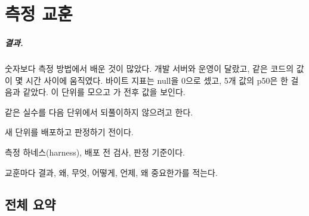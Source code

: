 \chapter{측정 교훈}\label{ch:lessons}

\paragraph{결과.}
숫자보다 측정 방법에서 배운 것이 많았다.
개발 서버와 운영이 달랐고, 같은 코드의 값이 몇 시간 사이에 움직였다.
바이트 지표는 null을 0으로 셌고, 5개 값의 p50은 한 걸음과 같았다.
이 단위를 모으고 가 전후 값을 보인다.

\begin{inbrief}
  \item[Why] 같은 실수를 다음 단위에서 되풀이하지 않으려고 한다.
  \item[When] 새 단위를 배포하고 판정하기 전이다.
  \item[Where] 측정 하네스(harness), 배포 전 검사, 판정 기준이다.
  \item[How] 교훈마다 결과, 왜, 무엇, 어떻게, 언제, 왜 중요한가를 적는다.
\end{inbrief}

\section{전체 요약}\label{sec:le-summary}

